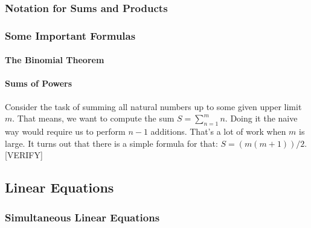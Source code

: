 \subsubsection{Notation for Sums and Products}


\subsubsection{Some Important Formulas}

\paragraph{The Binomial Theorem}

\paragraph{Sums of Powers}
Consider the task of summing all natural numbers up to some given upper limit $m$. That means, we want to compute the sum $S = \sum_{n=1}^{m} n$. Doing it the naive way would require us to perform $n-1$ additions. That's a lot of work when $m$ is large. It turns out that there is a simple formula for that: $S = (m (m+1)) / 2$. [VERIFY]





\subsection{Linear Equations}


\subsubsection{Simultaneous Linear Equations}


